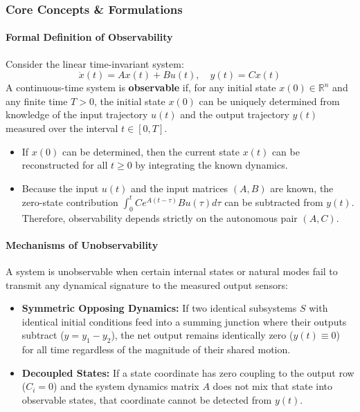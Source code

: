 \documentclass[12pt,onecolumn,twoside ]{article}
\begin{document}
	\subsubsection{Core Concepts \& Formulations}
	\paragraph{Formal Definition of Observability}
	Consider the linear time-invariant system: \[
	\dot{x}(t) = Ax(t) + Bu(t), \quad y(t) = Cx(t)
	\]
	A continuous-time system is \textbf{observable} if, for any initial state $x(0) \in \mathbb{R}^n$ and any finite time $T > 0$, the initial state $x(0)$ can be uniquely determined from knowledge of the input trajectory $u(t)$ and the output trajectory $y(t)$ measured over the interval $t \in [0, T]$.
	\begin{itemize}
		\item
		If $x(0)$ can be determined, then the current state $x(t)$ can be reconstructed for all $t \ge 0$ by integrating the known dynamics.
		\item
		Because the input $u(t)$ and the input matrices $(A, B)$ are known, the zero-state contribution $\int_0^t C e^{A(t-\tau)} B u(\tau) d\tau$ can be subtracted from $y(t)$. Therefore, observability depends strictly on the autonomous pair $(A, C)$.
	\end{itemize}
	\paragraph{Mechanisms of Unobservability}
	A system is unobservable when certain internal states or natural modes fail to transmit any dynamical signature to the measured output sensors:
	\begin{itemize}
		\item
		\textbf{Symmetric Opposing Dynamics:} If two identical subsystems $S$ with identical initial conditions feed into a summing junction where their outputs subtract ($y = y_1 - y_2$), the net output remains identically zero ($y(t) \equiv 0$) for all time regardless of the magnitude of their shared motion.
		\item
		\textbf{Decoupled States:} If a state coordinate has zero coupling to the output row ($C_i = 0$) and the system dynamics matrix $A$ does not mix that state into observable states, that coordinate cannot be detected from $y(t)$.
	\end{itemize}
\end{document}
